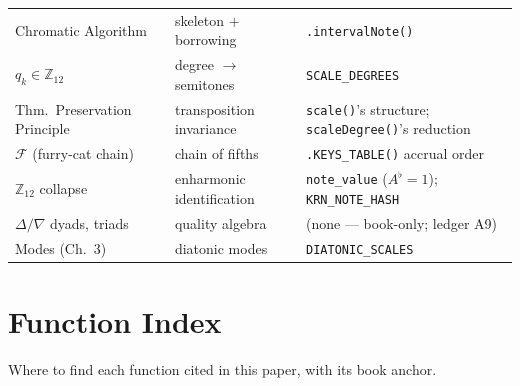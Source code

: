 \documentclass[11pt]{article}
\newcommand{\Maj}{\Delta}                       %
\newcommand{\Min}{\nabla}                       %
\newcommand{\FC}{\mathcal{F}}                   %
\newcommand{\Ztwelve}{\mathbb{Z}_{12}}
\theoremstyle{definition}
\theoremstyle{remark}
\newcommand{\code}[1]{\texttt{#1}}
\begin{document}
\begin{center}
\begin{tabular}{@{}p{4.1cm}p{4.1cm}p{5.2cm}@{}}
Chromatic Algorithm & skeleton $+$ borrowing & \code{.intervalNote()} \\
$q_k \in \Ztwelve$ & degree $\to$ semitones & \code{SCALE\_DEGREES} \\
Thm.\ Preservation Principle & transposition invariance & \code{scale()}'s structure; \code{scaleDegree()}'s reduction \\
$\FC$ (furry-cat chain) & chain of fifths & \code{.KEYS\_TABLE()} accrual order \\
$\Ztwelve$ collapse & enharmonic identification & \code{note\_value} ($A^{\flat} = 1$); \code{KRN\_NOTE\_HASH} \\
$\Maj / \Min$ dyads, triads & quality algebra & (none --- book-only; ledger A9) \\
Modes (Ch.~3) & diatonic modes & \code{DIATONIC\_SCALES} \\
\bottomrule
\end{tabular}
\end{center}

\section{Function Index}\label{app:functions}

Where to find each function cited in this paper, with its book anchor.
\end{document}
